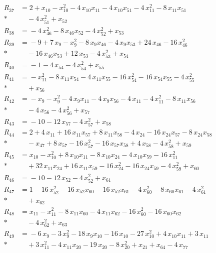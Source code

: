 \begin{align*}
R_{37} &={} 2 +x_{10} -x_{10}^{2} -4\,x_{10} x_{11} -4\,x_{10} x_{51} -4\,x_{11}^{2} -8\,x_{11} x_{51} \\*
&\quad{} -4\,x_{51}^{2} +x_{52} \\[2pt]
R_{38} &={} -4\,x_{46}^{2} -8\,x_{46} x_{52} -4\,x_{52}^{2} +x_{53} \\[2pt]
R_{39} &={} -9 +7\,x_{9} -x_{9}^{2} -8\,x_{9} x_{46} -4\,x_{9} x_{53} +24\,x_{46} -16\,x_{46}^{2} \\*
&\quad{} -16\,x_{46} x_{53} +12\,x_{53} -4\,x_{53}^{2} +x_{54} \\[2pt]
R_{40} &={} -1 -4\,x_{54} -4\,x_{54}^{2} +x_{55} \\[2pt]
R_{41} &={} -x_{11}^{2} -8\,x_{11} x_{54} -4\,x_{11} x_{55} -16\,x_{54}^{2} -16\,x_{54} x_{55} -4\,x_{55}^{2} \\*
&\quad{} +x_{56} \\[2pt]
R_{42} &={} -x_{9} -x_{9}^{2} -4\,x_{9} x_{11} -4\,x_{9} x_{56} -4\,x_{11} -4\,x_{11}^{2} -8\,x_{11} x_{56} \\*
&\quad{} -4\,x_{56} -4\,x_{56}^{2} +x_{57} \\[2pt]
R_{43} &={} -10 -12\,x_{57} -4\,x_{57}^{2} +x_{58} \\[2pt]
R_{44} &={} 2 +4\,x_{11} +16\,x_{11} x_{57} +8\,x_{11} x_{58} -4\,x_{24} -16\,x_{24} x_{57} -8\,x_{24} x_{58} \\*
&\quad{} -x_{47} +8\,x_{57} -16\,x_{57}^{2} -16\,x_{57} x_{58} +4\,x_{58} -4\,x_{58}^{2} +x_{59} \\[2pt]
R_{45} &={} x_{10} -x_{10}^{2} +8\,x_{10} x_{11} -8\,x_{10} x_{24} -4\,x_{10} x_{59} -16\,x_{11}^{2} \\*
&\quad{} +32\,x_{11} x_{24} +16\,x_{11} x_{59} -16\,x_{24}^{2} -16\,x_{24} x_{59} -4\,x_{59}^{2} +x_{60} \\[2pt]
R_{46} &={} -10 -12\,x_{52} -4\,x_{52}^{2} +x_{61} \\[2pt]
R_{47} &={} 1 -16\,x_{52}^{2} -16\,x_{52} x_{60} -16\,x_{52} x_{61} -4\,x_{60}^{2} -8\,x_{60} x_{61} -4\,x_{61}^{2} \\*
&\quad{} +x_{62} \\[2pt]
R_{48} &={} x_{11} -x_{11}^{2} -8\,x_{11} x_{60} -4\,x_{11} x_{62} -16\,x_{60}^{2} -16\,x_{60} x_{62} \\*
&\quad{} -4\,x_{62}^{2} +x_{63} \\[2pt]
R_{49} &={} -6\,x_{9} -3\,x_{9}^{2} -18\,x_{9} x_{10} -16\,x_{10} -27\,x_{10}^{2} +4\,x_{10} x_{11} +3\,x_{11} \\*
&\quad{} +3\,x_{11}^{2} -4\,x_{11} x_{20} -19\,x_{20} -8\,x_{20}^{2} +x_{21} +x_{64} -4\,x_{77} \\[2pt]

\end{align*}
